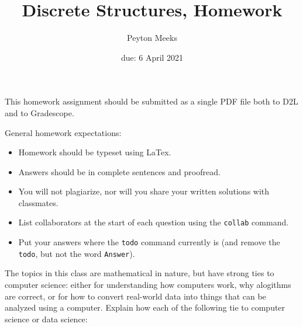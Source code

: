 \documentclass{article}
\title{Discrete Structures, Homework \hwnum}
\author{Peyton Meeks}
\date{due: 6 April 2021}
\begin{document}
\maketitle

This homework assignment should be
submitted as a single PDF file both to D2L and to Gradescope.

General homework expectations:
\begin{itemize}
    \item Homework should be typeset using LaTex.
    \item Answers should be in complete sentences and proofread.
    \item You will not plagiarize, nor will you share your written solutions
        with classmates.
    \item List collaborators at the start of each question using the \texttt{collab} command.
    \item Put your answers where the \texttt{todo} command currently is (and
        remove the \texttt{todo}, but not the word \texttt{Answer}).
\end{itemize}


 

The topics in this class are mathematical in nature, but have strong ties to
computer science: either for understanding how computers work, why alogithms are
correct, or for how to convert real-world data into things that can be analyzed
using a computer.  Explain how each of the following tie to computer science or
data science:
\end{document}
